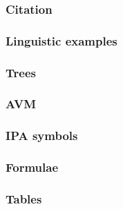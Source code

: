 




\begin{frame}
\frametitle{Citation}

\end{frame}

\begin{frame}
\frametitle{Linguistic examples}

\end{frame}

\begin{frame}
\frametitle{Trees}

\end{frame}

\begin{frame}
\frametitle{AVM}

\end{frame}

\begin{frame}
\frametitle{IPA symbols}

\end{frame}

\begin{frame}
\frametitle{Formulae}

\end{frame}

\begin{frame}
\frametitle{Tables}

\end{frame}